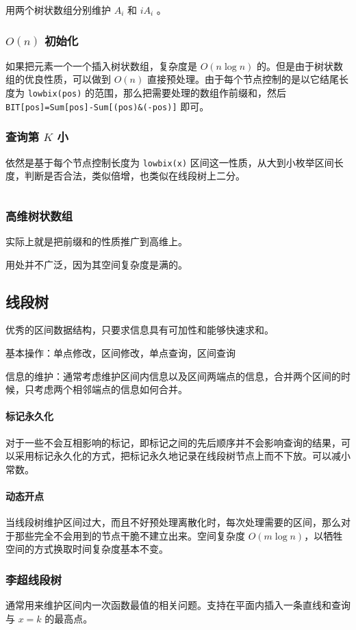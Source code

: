 \documentclass[UTF-8]{ctexart}
\newcommand{\cpp}[1]{\inputminted[bgcolor=bg,breaklines,breakanywhere=true]{c++}{#1}}
\begin{document}
			用两个树状数组分别维护 $A _ i$ 和 $iA _ i$ 。
			\subsubsection{ $O(n)$ 初始化}
			如果把元素一个一个插入树状数组，复杂度是 $O(n\log n)$ 的。但是由于树状数组的优良性质，可以做到 $O(n)$ 直接预处理。由于每个节点控制的是以它结尾长度为 \texttt{lowbix(pos)} 的范围，那么把需要处理的数组作前缀和，然后 \texttt{BIT[pos]=Sum[pos]-Sum[(pos)\&(-pos)]} 即可。
			\subsubsection{查询第 $K$ 小}
			依然是基于每个节点控制长度为 \texttt{lowbix(x)} 区间这一性质，从大到小枚举区间长度，判断是否合法，类似倍增，也类似在线段树上二分。
			\cpp{code//DataStruct//fenwickkth.cpp}
			\subsubsection{高维树状数组}
			实际上就是把前缀和的性质推广到高维上。
	
			用处并不广泛，因为其空间复杂度是满的。
		\subsection{线段树}
		优秀的区间数据结构，只要求信息具有可加性和能够快速求和。
	
		基本操作：单点修改，区间修改，单点查询，区间查询
	
		信息的维护：通常考虑维护区间内信息以及区间两端点的信息，合并两个区间的时候，只考虑两个相邻端点的信息如何合并。
		\paragraph{标记永久化} 对于一些不会互相影响的标记，即标记之间的先后顺序并不会影响查询的结果，可以采用标记永久化的方式，把标记永久地记录在线段树节点上而不下放。可以减小常数。
	
		\paragraph{动态开点} 当线段树维护区间过大，而且不好预处理离散化时，每次处理需要的区间，那么对于那些完全不会用到的节点干脆不建立出来。空间复杂度 $O(m \log n)$，以牺牲空间的方式换取时间复杂度基本不变。
			\subsubsection{李超线段树}
			通常用来维护区间内一次函数最值的相关问题。支持在平面内插入一条直线和查询与 $x=k$ 的最高点。
	
\end{document}
